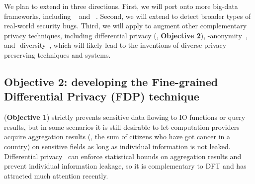 



 We plan to extend \kakute in 
three directions. First, we will port \kakute onto more big-data frameworks, 
including \pig~\cite{pig:vldb08} and \hadoop~\cite{hadoop}. Second, we will 
extend \kakute to detect broader types of real-world security bugs. Third, we 
will apply \kakute to augment other complementary privacy techniques, including 
differential privacy (\ie, \textbf{Objective 2}),
-anonymity~\cite{kanonymity}, and 
-diversity~\cite{icde06:ldiversity}, which will likely lead to the 
inventions of diverse privacy-preserving techniques and systems. 

\vspace{-.15in}\subsection{Objective 2: developing the Fine-grained 
Differential Privacy (FDP) technique}\label{sec:obj2}\vspace{-.075in}



\kakute (\textbf{Objective 1}) strictly prevents
sensitive data flowing to IO functions or query results, but in some scenarios 
it is still desirable to let computation providers acquire aggregation 
results (\eg, the sum of citizens who have got cancer in a country) 
on sensitive fields as long as individual information is not leaked. 
Differential privacy~\cite{Dwork2006Differential} can enforce statistical 
bounds on 
aggregation results and prevent individual information leakage, so it is 
complementary to DFT and has attracted much attention recently.


